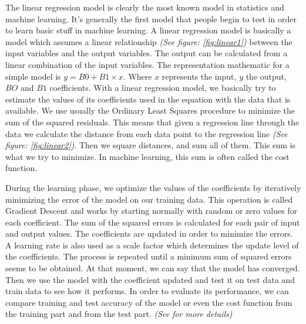 \documentclass[a4]{article}
\begin{document}
The linear regression model is clearly the most known model in statistics and machine learning. It’s generally the first model that people begin to test in order to learn basic stuff in machine learning. A linear regression model is basically a model which assumes a linear relationship \textit{(See figure: \ref{fig:linear1})} between the input variables and the output variables. The output can be calculated from a linear combination of the input variables. The representation mathematic for a simple model is $y = B0 + B1\times x$. Where $x$ represents the input, $y$ the output, $BO$ and $B1$ coefficients.
With a linear regression model, we basically try to estimate the values of its coefficients used in the equation with the data that is available. We use usually the Ordinary Least Squares procedure to minimize the sum of the squared residuals. This means that given a regression line through the data we calculate the distance from each data point to the regression line \textit{(See figure: \ref{fig:linear2})}. Then we square distances, and sum all of them. This sum is what we try to minimize. In machine learning, this sum is often called the cost function. 

During the learning phase, we optimize the values of the coefficients by iteratively minimizing the error of the model on our training data. This operation is called Gradient Descent and works by starting normally with random or zero values for each coefficient. The sum of the squared errors is calculated for each pair of input and output values. The coefficients are updated in order to minimize the errors. A learning rate is also used as a scale factor which determines the update level of the coefficients. The process is repeated until a minimum sum of squared errors seems to be obtained. At that moment, we can say that the model has converged. Then we use the model with the coefficient updated and test it on test data and train data to see how it performs. In order to evaluate its performance, we can compare training and test accuracy of the model or even the cost function from the training part and from the test part. \textit{(See \cite{brownlee2} for more details)}
\end{document}
